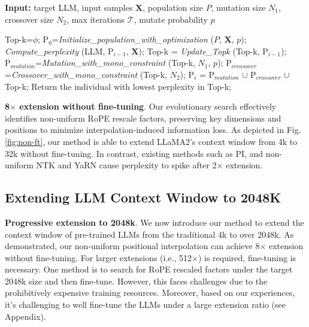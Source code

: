 \documentclass{article}
\theoremstyle{plain}
\theoremstyle{definition}
\theoremstyle{remark}
\begin{document}
\begin{algorithm}[t]
	\small
	\caption{The search algorithm}
	\textbf{Input:} target LLM, input samples $\mathbf{X}$,   population size $P$, mutation size $N_1$, crossover size $N_2$, max iterations $\mathcal{T}$, mutate probability $p$\\
	\vspace{-2.5ex}

	\begin{algorithmic}[1]
		\label{alg:search}
		\STATE Top-k=$\phi$;	
		\STATE $\text{P}_0$=\textit{Initialize\_population\_with\_optimization} ($P$, $\mathbf{X}$, $p$); 
		\STATE \textit{Compute\_perplexity} (LLM, $\text{P}_{i-1}$, $\mathbf{X}$);
		\STATE  Top-k = \textit{Update\_Topk} (Top-k, $\text{P}_{i-1}$);
		\STATE$\text{P}_{mutation}$=\textit{Mutation\_with\_mono\_constraint} (Top-k, $N_1$, $p$); 
		\STATE $\text{P}_{crossover}$=\textit{Crossover\_with\_mono\_constraint} (Top-k, $N_2$);
		\STATE $\text{P}_i$ = $\text{P}_{mutation}$ $\cup$ $\text{P}_{crossover}$ $\cup$ Top-k;
		\ENDFOR
		\STATE Return the individual with lowest perplexity in Top-k;
	\end{algorithmic}
\end{algorithm}

\noindent\textbf{8$\times$ extension without fine-tuning}. Our evolutionary search  effectively identifies non-uniform RoPE rescale factors, preserving key dimensions and positions to minimize interpolation-induced information loss. As depicted in Fig.\ref{fig:non-ft}, our method is able to extend LLaMA2's context window from 4k to 32k without fine-tuning. In contrast, existing methods such as PI, and non-uniform NTK and YaRN cause perplexity to spike after 2$\times$ extension.

\vspace{-1.5ex}
\subsection{Extending LLM Context Window to 2048K}
\label{sec:extendto2048k}
\vspace{-1ex}
\noindent\textbf{Progressive extension to 2048k}. 
We now introduce our method  to extend the context window of pre-trained LLMs from the traditional 4k to over 2048k. As demonstrated, our non-uniform positional interpolation can achieve 8$\times$ extension without fine-tuning. 
For larger extensions (i.e., 512$\times$) is required, fine-tuning is necessary. One method is to search for RoPE rescaled factors under the target 2048k size and then fine-tune. 
However, this faces challenges due to the prohibitively expensive training resources. 
Moreover,  based on our experiences, it's challenging to well fine-tune the LLMs under a  large extension ratio (see Appendix). 
\end{document}
